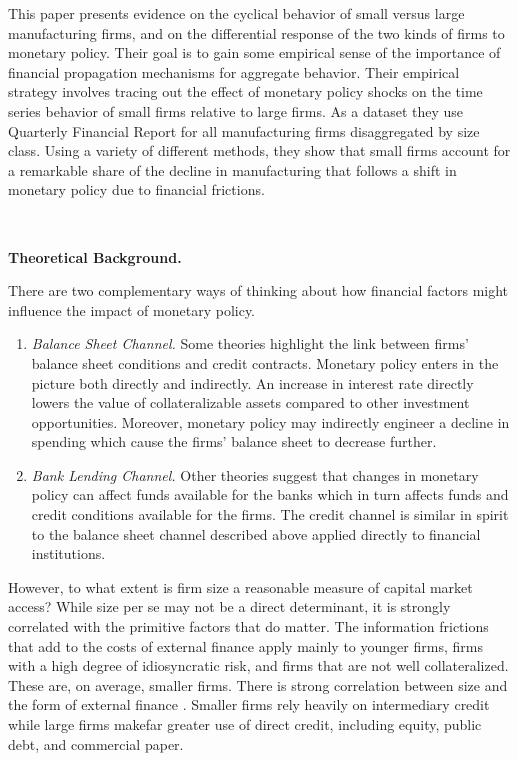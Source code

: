 \documentclass{article}
\begin{document}
{This paper presents evidence on the cyclical behavior of small versus large manufacturing firms, and on the differential response of the two kinds of firms to monetary policy. Their goal is to gain some empirical sense of the importance of financial propagation mechanisms for aggregate behavior. Their empirical strategy involves tracing out the effect of monetary policy shocks on the time series behavior of small firms relative to large firms. As a dataset they use Quarterly Financial Report for all manufacturing firms disaggregated by size class. Using a variety of different methods, they show that small firms account for a remarkable share of the decline in manufacturing that follows a shift in monetary policy due to financial frictions.

\

\begin{center}
\textbf{Theoretical Background.}
\end{center} 

There are two complementary ways of thinking about how financial factors might influence the impact of monetary policy.

\begin{enumerate}
	\item \textit{Balance Sheet Channel.} Some theories highlight the link between firms' balance sheet conditions and credit contracts. Monetary policy enters in the picture both directly and indirectly. An increase in interest rate directly lowers the value of collateralizable assets compared to other investment opportunities. Moreover, monetary policy may indirectly engineer a decline in spending which cause the firms' balance sheet to decrease further. 
	\item \textit{Bank Lending Channel.} Other theories suggest that changes in monetary policy can affect funds available for the banks which in turn affects funds and credit conditions available for the firms. The credit channel is similar in spirit to the balance sheet channel described above applied directly to financial institutions.
\end{enumerate}

However, to what extent is firm size a reasonable measure of capital market access? While size per se may not be a direct determinant, it is strongly correlated with the primitive factors that do matter. The information frictions that add to the costs of external finance apply mainly to younger firms, firms with a high degree of idiosyncratic risk, and firms that are not well collateralized. These are, on average, smaller firms. There is strong correlation between size and the form of external finance . Smaller firms rely heavily on intermediary credit while large firms makefar greater use of direct credit, including equity, public debt, and commercial paper. 

}
\end{document}
